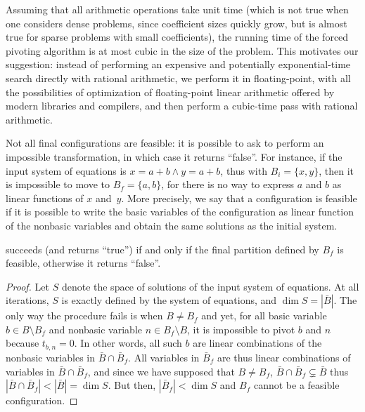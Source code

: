 Assuming that all arithmetic operations take unit time (which is not true when one considers dense problems, since coefficient sizes quickly grow, but is almost true for sparse problems with small coefficients), the running time of the forced pivoting algorithm is at most cubic in the size of the problem. This motivates our suggestion: instead of performing an expensive and potentially exponential-time search directly with rational arithmetic, we perform it in floating-point, with all the possibilities of optimization of floating-point linear arithmetic offered by modern libraries and compilers, and then perform a cubic-time pass with rational arithmetic.

Not all final configurations are feasible: it is possible to ask  to perform an impossible transformation, in which case it returns ``false''. For instance, if the input system of equations is $x = a + b \land y = a + b$,
thus with $B_i = \{ x, y \}$, then it is impossible to move to $B_f = \{ a, b \}$, for there is no way to express $a$ and $b$ as linear functions of $x$ and~$y$. More precisely, we say that a configuration is feasible if it is possible to write the basic variables of the configuration as linear function of the nonbasic variables and obtain the same solutions as the initial system.

\begin{lemma}
 succeeds (and returns ``true'') if and only if the final partition defined by $B_f$ is feasible, otherwise it returns ``false''.
\end{lemma}

\begin{proof}
Let $S$ denote the space of solutions of the input system of equations. At all iterations, $S$ is exactly defined by the system of equations, and $\dim S = |\bar{B}|$.
The only way the procedure fails is when $B \neq B_f$ and yet, for all basic variable $b \in B \setminus B_f$ and nonbasic variable $n \in B_f \setminus B$, it is impossible to pivot $b$ and $n$ because $t_{b,n} = 0$. In other words, all such $b$ are linear combinations of the nonbasic variables in $\bar{B} \cap \bar{B}_f$. All variables in $\bar{B}_f$ are thus linear combinations of variables in $\bar{B} \cap \bar{B}_f$, and since we have supposed that $B \neq B_f$, $\bar{B} \cap \bar{B}_f \subsetneq \bar{B}$ thus $|\bar{B} \cap \bar{B}_f| < |\bar{B}| = \dim S$. But then, $|\bar{B}_f| < \dim S$ and $B_f$ cannot be a feasible configuration.
\end{proof}

